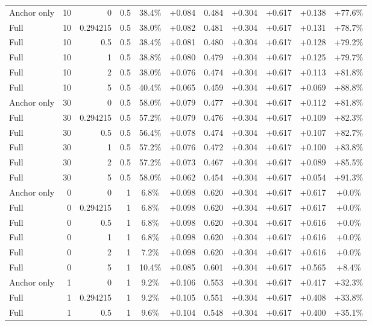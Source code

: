 \begin{table}[htbp]
\begin{tabular}{lrrrccccccc}
Anchor only & 10 & 0 & 0.5 & 38.4\% & +0.084 & 0.484 & +0.304 & +0.617 & +0.138 & +77.6\% \\
Full & 10 & 0.294215 & 0.5 & 38.0\% & +0.082 & 0.481 & +0.304 & +0.617 & +0.131 & +78.7\% \\
Full & 10 & 0.5 & 0.5 & 38.4\% & +0.081 & 0.480 & +0.304 & +0.617 & +0.128 & +79.2\% \\
Full & 10 & 1 & 0.5 & 38.8\% & +0.080 & 0.479 & +0.304 & +0.617 & +0.125 & +79.7\% \\
Full & 10 & 2 & 0.5 & 38.0\% & +0.076 & 0.474 & +0.304 & +0.617 & +0.113 & +81.8\% \\
Full & 10 & 5 & 0.5 & 40.4\% & +0.065 & 0.459 & +0.304 & +0.617 & +0.069 & +88.8\% \\
Anchor only & 30 & 0 & 0.5 & 58.0\% & +0.079 & 0.477 & +0.304 & +0.617 & +0.112 & +81.8\% \\
Full & 30 & 0.294215 & 0.5 & 57.2\% & +0.079 & 0.476 & +0.304 & +0.617 & +0.109 & +82.3\% \\
Full & 30 & 0.5 & 0.5 & 56.4\% & +0.078 & 0.474 & +0.304 & +0.617 & +0.107 & +82.7\% \\
Full & 30 & 1 & 0.5 & 57.2\% & +0.076 & 0.472 & +0.304 & +0.617 & +0.100 & +83.8\% \\
Full & 30 & 2 & 0.5 & 57.2\% & +0.073 & 0.467 & +0.304 & +0.617 & +0.089 & +85.5\% \\
Full & 30 & 5 & 0.5 & 58.0\% & +0.062 & 0.454 & +0.304 & +0.617 & +0.054 & +91.3\% \\
Anchor only & 0 & 0 & 1 & 6.8\% & +0.098 & 0.620 & +0.304 & +0.617 & +0.617 & +0.0\% \\
Full & 0 & 0.294215 & 1 & 6.8\% & +0.098 & 0.620 & +0.304 & +0.617 & +0.617 & +0.0\% \\
Full & 0 & 0.5 & 1 & 6.8\% & +0.098 & 0.620 & +0.304 & +0.617 & +0.616 & +0.0\% \\
Full & 0 & 1 & 1 & 6.8\% & +0.098 & 0.620 & +0.304 & +0.617 & +0.616 & +0.0\% \\
Full & 0 & 2 & 1 & 7.2\% & +0.098 & 0.620 & +0.304 & +0.617 & +0.616 & +0.0\% \\
Full & 0 & 5 & 1 & 10.4\% & +0.085 & 0.601 & +0.304 & +0.617 & +0.565 & +8.4\% \\
Anchor only & 1 & 0 & 1 & 9.2\% & +0.106 & 0.553 & +0.304 & +0.617 & +0.417 & +32.3\% \\
Full & 1 & 0.294215 & 1 & 9.2\% & +0.105 & 0.551 & +0.304 & +0.617 & +0.408 & +33.8\% \\
Full & 1 & 0.5 & 1 & 9.6\% & +0.104 & 0.548 & +0.304 & +0.617 & +0.400 & +35.1\% \\

\end{tabular}
\end{table}
